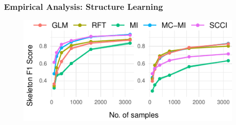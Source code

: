 \documentclass{beamer}
\begin{document}
\begin{frame}
	\frametitle{Empirical Analysis: Structure Learning}
	\begin{figure}
		\centering
		\includegraphics{imgs/sl.pdf}
	\end{figure}
\end{frame}
\end{document}
